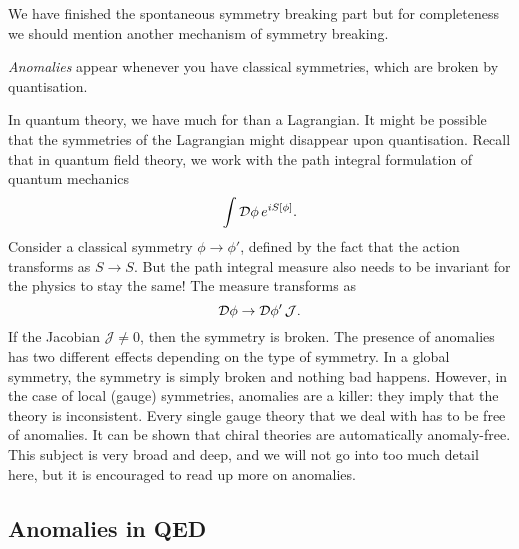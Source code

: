 We have finished the spontaneous symmetry breaking part but for completeness we should mention another mechanism of symmetry breaking.
\begin{definition}[anomalies]
  \emph{Anomalies} appear whenever you have classical symmetries, which are broken by quantisation.
\end{definition}
In quantum theory, we have much for than a Lagrangian. It might be possible that the symmetries of the Lagrangian might disappear upon quantisation.
Recall that in quantum field theory, we work with the path integral formulation of quantum mechanics
\begin{equation}
  \int \mathop{\mathcal{D} \phi} e^{i S[\phi]}.
\end{equation}
Consider a classical symmetry $\phi \to \phi'$, defined by the fact that the action transforms as $S \to S$.
But the path integral measure also needs to be invariant for the physics to stay the same! The measure transforms as
\begin{equation}
  \mathop{\mathcal{D} \phi} \to \mathop{\mathcal{D} \phi'} \mathcal{J}.
\end{equation}
If the Jacobian $\mathcal{J} \neq 0$, then the symmetry is broken.
The presence of anomalies has two different effects depending on the type of symmetry.
In a global symmetry, the symmetry is simply broken and nothing bad happens.
However, in the case of local (gauge) symmetries, anomalies are a killer: they imply that the theory is inconsistent.
Every single gauge theory that we deal with has to be free of anomalies.
It can be shown that chiral theories are automatically anomaly-free.
This subject is very broad and deep, and we will not go into too much detail here, but it is encouraged to read up more on anomalies.

\subsection{Anomalies in QED}%
\label{sub:anomalies_in_qed}

